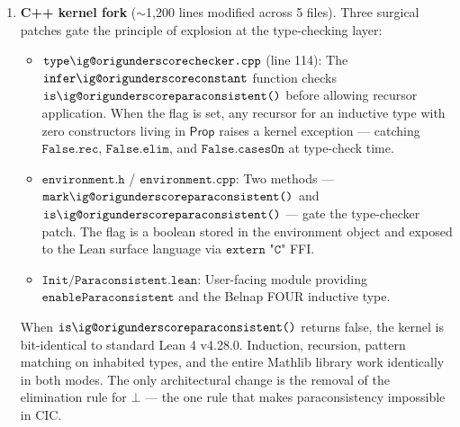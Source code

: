 \documentclass[12pt,a4paper]{article}
\makeatletter
\renewcommand{\_}{\ig@origunderscore\discretionary{}{}{}}
\makeatother
\begin{document}
\begin{enumerate}
 \item \textbf{C++ kernel fork} ($\sim$1,200 lines modified across 5 files). Three surgical patches gate the
principle of explosion at the type-checking layer:
 \begin{itemize}
  \item $\texttt{type\_checker.cpp}$ (line 114): The $\texttt{infer\_constant}$ function checks
$\texttt{is\_paraconsistent()}$ before allowing recursor application. When the flag is set, any recursor for an
inductive type with zero constructors living in $\mathsf{Prop}$ raises a kernel exception --- catching
$\texttt{False.rec}$, $\texttt{False.elim}$, and $\texttt{False.casesOn}$ at type-check time.
  \item $\texttt{environment.h}$ / $\texttt{environment.cpp}$: Two methods ---
$\texttt{mark\_paraconsistent()}$ and $\texttt{is\_paraconsistent()}$ --- gate the type-checker patch. The flag is a
boolean stored in the environment object and exposed to the Lean surface language via $\texttt{extern "C"}$ FFI.
  \item $\texttt{Init/Paraconsistent.lean}$: User-facing module providing
$\texttt{enableParaconsistent}$ and the Belnap FOUR inductive type.
 \end{itemize}
When $\texttt{is\_paraconsistent()}$ returns false, the kernel is bit-identical to standard Lean 4 v4.28.0. Induction,
recursion, pattern matching on inhabited types, and the entire Mathlib library work identically in both modes. The only
architectural change is the removal of the elimination rule for $\bot$ --- the one rule that makes paraconsistency
impossible in CIC.


\end{enumerate}
\end{document}
